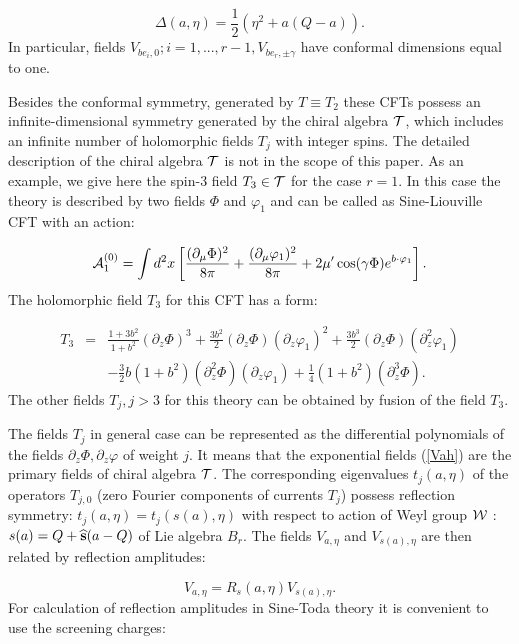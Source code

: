 \documentclass[a4paper,12pt]{article}
\begin{document}
\begin{equation}
\Delta (a,\eta )=\frac 12(\eta ^2+a\left( Q-a\right) ). \label{Dimen} 
\end{equation}
In particular, fields $V_{be_i,0};i=1,...,r-1,V_{be_r,\pm \gamma }$ have
conformal dimensions equal to one.

Besides the conformal symmetry, generated by $T\equiv T_2$ these CFTs
possess an infinite-dimensional symmetry generated by the chiral algebra 
${\cal T}$, which includes an infinite number of holomorphic fields $T_j$
with integer spins. The detailed description of the chiral algebra ${\cal T}$
is not in the scope of this paper. As an example, we give here the spin-3
field $T_3\in {\cal T}$ for the case $r=1$. In this case the theory is
described by two fields $\Phi $ and $\varphi _1$ and can be called as
Sine-Liouville CFT with an action:

\begin{equation}
{\cal A}_1^{(0)}=\int d^2x\left[ \frac{(\partial _\mu \Phi )^2}{8\pi }+\frac{
(\partial _\mu \varphi _1)^2}{8\pi }+2\mu ^{\prime }\cos (\gamma \Phi
)e^{b\cdot \varphi _1}\right].  \label{SLm}
\end{equation}
The holomorphic field $T_3$ for this CFT has a form:

\begin{eqnarray*}
T_3 &=&\frac{1+3b^2}{1+b^2}(\partial _z\Phi )^3+\frac{3b^2}2(\partial _z\Phi
)(\partial _z\varphi _1)^2+\frac{3b^3}2(\partial _z\Phi )(\partial
_z^2\varphi _1) \\
&&-\frac 32b(1+b^2)(\partial _z^2\Phi )(\partial _z\varphi _1)+\frac 14
(1+b^2)(\partial _z^3\Phi ).
\end{eqnarray*}
The other fields $T_j,j>3$ for this theory can be obtained by fusion of the
field $T_3.$

The fields $T_j$ in general case can be represented as the differential
polynomials of the fields $\partial _z\Phi ,\partial _z\varphi $ of weight 
$ j $. It means that the exponential fields (\ref{Vah}) are the primary fields
of chiral algebra ${\cal T}$. The corresponding eigenvalues $t_j(a,\eta )$
of the operators $T_{j,0}$ (zero Fourier components of currents $T_j$)
possess reflection symmetry: $t_j(a,\eta )=t_j(s(a),\eta )$ with respect to
action of Weyl group ${\cal W}$ : $s(a)=Q+\widehat{{\bf s}}(a-Q)$ of Lie
algebra $B_r.$ The fields $V_{a,\eta }$ and $V_{s(a),\eta }$ are then
related by reflection amplitudes:

\begin{equation}
V_{a,\eta }=R_s(a,\eta )V_{s(a),\eta }.  \label{Rre}
\end{equation}
For calculation of reflection amplitudes in Sine-Toda theory it is
convenient to use the screening charges:
\end{document}
